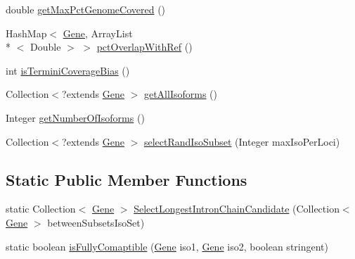 \begin{DoxyCompactItemize}
\item 
double \hyperlink{classbroad_1_1pda_1_1annotation_1_1_locus_aa43b3954b74d63bec8ac72a52e55b89c}{get\+Max\+Pct\+Genome\+Covered} ()
\item 
Hash\+Map$<$ \hyperlink{classumms_1_1core_1_1annotation_1_1_gene}{Gene}, Array\+List\\*
$<$ Double $>$ $>$ \hyperlink{classbroad_1_1pda_1_1annotation_1_1_locus_ac67747dc4498eabfcc52df6e083aee0b}{pct\+Overlap\+With\+Ref} ()
\item 
int \hyperlink{classbroad_1_1pda_1_1annotation_1_1_locus_a647a1e88afae9412ccedfc6284f1d979}{is\+Termini\+Coverage\+Bias} ()
\item 
Collection$<$?extends \hyperlink{classumms_1_1core_1_1annotation_1_1_gene}{Gene} $>$ \hyperlink{classbroad_1_1pda_1_1annotation_1_1_locus_a4d1f5f7f21b402725c8a43ccdc65bde8}{get\+All\+Isoforms} ()
\item 
Integer \hyperlink{classbroad_1_1pda_1_1annotation_1_1_locus_ae17acc06fa08a70dba97d64b165b7260}{get\+Number\+Of\+Isoforms} ()
\item 
Collection$<$?extends \hyperlink{classumms_1_1core_1_1annotation_1_1_gene}{Gene} $>$ \hyperlink{classbroad_1_1pda_1_1annotation_1_1_locus_a5b93959c80e50de0f2dd758c382a74d2}{select\+Rand\+Iso\+Subset} (Integer max\+Iso\+Per\+Loci)
\end{DoxyCompactItemize}
\subsection*{Static Public Member Functions}
\begin{DoxyCompactItemize}
\item 
static Collection$<$ \hyperlink{classumms_1_1core_1_1annotation_1_1_gene}{Gene} $>$ \hyperlink{classbroad_1_1pda_1_1annotation_1_1_locus_a11d537e3a80eacc32bb221711bc03dfc}{Select\+Longest\+Intron\+Chain\+Candidate} (Collection$<$ \hyperlink{classumms_1_1core_1_1annotation_1_1_gene}{Gene} $>$ between\+Subsets\+Iso\+Set)
\item 
static boolean \hyperlink{classbroad_1_1pda_1_1annotation_1_1_locus_aa1a696f876a12b75cfab2f26340e6c1f}{is\+Fully\+Comaptible} (\hyperlink{classumms_1_1core_1_1annotation_1_1_gene}{Gene} iso1, \hyperlink{classumms_1_1core_1_1annotation_1_1_gene}{Gene} iso2, boolean stringent)
\end{DoxyCompactItemize}


